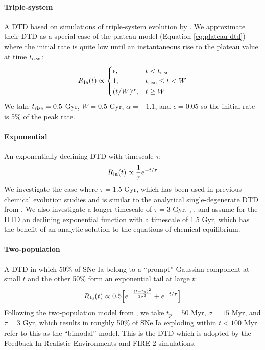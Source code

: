 \documentclass[twocolumn,twocolappendix,linenumbers,trackchanges]{aastex631}
\begin{document}
\paragraph{Triple-system} A DTD based on simulations of triple-system evolution by \citet{Rajamuthukumar2023-TripleEvolution}. We approximate their DTD as a special case of the plateau model (Equation \ref{eq:plateau-dtd}) where the initial rate is quite low until an instantaneous rise to the plateau value at time $t_{\rm rise}$:
\begin{equation}
    R_{\rm Ia}(t) \propto
    \begin{cases}
        \epsilon, & t < t_{\rm rise} \\
        1, & t_{\rm rise} \leq t < W \\
        (t / W) ^ \alpha, & t \geq W
    \end{cases}
    \label{eq:triple-dtd}
\end{equation}
We take $t_{\rm rise}=0.5$ Gyr, $W=0.5$ Gyr, $\alpha=-1.1$, and $\epsilon=0.05$ so the initial rate is 5\% of the peak rate.

\paragraph{Exponential} An exponentially declining DTD with timescale $\tau$:
\begin{equation}
    R_{\rm Ia}(t) \propto \frac{1}{\tau} e^{-t/\tau}
    \label{eq:exponential-dtd}
\end{equation}
We investigate the case where $\tau=1.5$ Gyr, which has been used in previous chemical evolution studies \citep[e.g.,][]{Schonrich2009-RadialMixing,Weinberg2017-ChemicalEquilibrium} and is similar to the analytical single-degenerate DTD from \citet{Greggio2005-AnalyticalRates}. We also investigate a longer timescale of $\tau=3$ Gyr. \citet{Matteucci1986-SupernovaEnrichment}, \citet{Strolger2020-ExponentialDTD}.
\citet{Schonrich2009-RadialMixing} and \citet{Weinberg2017-ChemicalEquilibrium} assume for the DTD an declining exponential function with a timescale of 1.5 Gyr, which has the benefit of an analytic solution to the equations of chemical equilibrium.

\paragraph{Two-population} A DTD in which 50\% of SNe Ia belong to a ``prompt'' Gaussian component at small $t$ and the other 50\% form an exponential tail at large $t$:
\begin{equation}
    R_{\rm Ia}(t) \propto 0.5\Big[e^{-\frac{(t-t_p)^2}{2\sigma^2}} + e^{-t/\tau}\Big]
    \label{eq:prompt-dtd}
\end{equation}
Following the two-population model from \citet{Mannucci2006-TwoPopulations}, we take $t_p=50$ Myr, $\sigma=15$ Myr, and $\tau=3$ Gyr, which results in roughly 50\% of SNe Ia exploding within $t<100$ Myr. \citet{Poulhazan2018-PrecisionPollution} refer to this as the ``bimodal'' model. This is the DTD which is adopted by the Feedback In Realistic Environments \citep[FIRE;][]{Hopkins2014-FIRE-1} and FIRE-2 \citep{Hopkins2018-FIRE-2} simulations.
\end{document}
